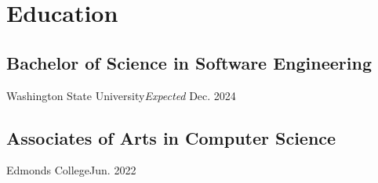 \section{Education}
\subsection{Bachelor of Science in Software Engineering}{Washington State University}{\textit{Expected} Dec. 2024}

\subsection{Associates of Arts in Computer Science}{Edmonds College}{Jun. 2022}
\vspace{0.2em}

